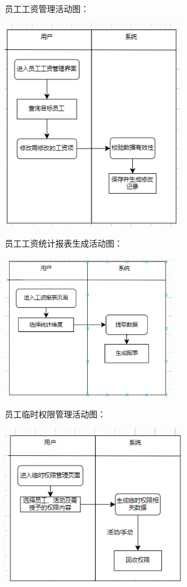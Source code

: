 \documentclass[]{article}
\begin{document}
员工工资管理活动图：

\includegraphics[width=3.02917in,height=3.51458in]{media/media/image11.png}

员工工资统计报表生成活动图：

\includegraphics[width=2.90764in,height=2.41597in]{media/media/image12.png}

员工临时权限管理活动图：

\includegraphics[width=3.075in,height=2.66458in]{media/media/image13.png}
\end{document}
